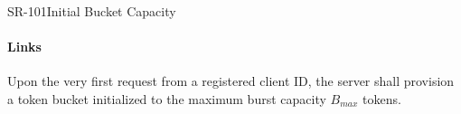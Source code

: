 \begin{softwarerequirement}{SR-101}{Initial Bucket Capacity}
\paragraph{Links} 

Upon the very first request from a registered client ID,
the server shall provision a token bucket initialized to the maximum burst capacity $B_{max}$ tokens.
\end{softwarerequirement}